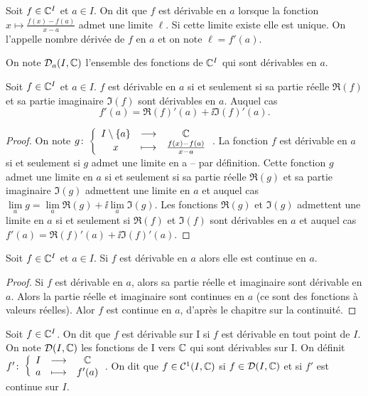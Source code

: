 \begin{defdef}
  Soit \(f \in \mathbb{C}^I\) et \(a \in I\). On dit que \(f\) est dérivable en \(a\) lorsque la fonction \(x \longmapsto \frac{f(x)-f(a)}{x-a}\) admet une limite \(\ell\). Si cette limite existe elle est unique. On l'appelle nombre dérivée de \(f\) en \(a\) et on note \(\ell=f'(a)\).

On note \(\mathcal{D}_{a}(I,\mathbb{C})\) l'ensemble des fonctions de \(\mathbb{C}^I\) qui sont dérivables en \(a\).
\end{defdef}
\begin{theo}
  Soit \(f \in \mathbb{C}^I\) et \(a \in I\). \(f\) est dérivable en \(a\) si et seulement si sa partie réelle \(\Re(f)\) et sa partie imaginaire \(\Im(f)\) sont dérivables en \(a\). Auquel cas
  \begin{equation}
    f'(a) = \Re(f)'(a) + \ii \Im(f)'(a).
  \end{equation}
\end{theo}
\begin{proof}
 On note \(g\colon \left\{\begin{array}{ccc} I\setminus\{a\} & \longrightarrow &\mathbb{C}\\ x & \longmapsto & \frac{f(x)-f(a)}{x-a} \end{array} \right.\). La fonction \(f\) est dérivable en \(a\) si et seulement si \(g\) admet une limite en a -- par définition. Cette fonction \(g\) admet une limite en \(a\) si et seulement si sa partie réelle \(\Re(g)\) et sa partie imaginaire \(\Im(g)\) admettent une limite en \(a\) et auquel cas \(\lim\limits_{a}g =  \lim\limits_{a} \Re(g) + \ii \lim\limits_{a} \Im(g)\). Les fonctions \(\Re(g)\) et \(\Im(g)\) admettent une limite en \(a\) si et seulement si  \(\Re(f)\) et \(\Im(f)\) sont dérivables en \(a\) et auquel cas \(f'(a) = \Re(f)'(a) + \ii \Im(f)'(a)\).
\end{proof}
\begin{prop}
  Soit \(f \in \mathbb{C}^I\) et \(a \in I\). Si \(f\) est dérivable en \(a\) alors elle est continue en \(a\).
\end{prop}
\begin{proof}
  Si \(f\) est dérivable en \(a\), alors sa partie réelle et imaginaire sont dérivable en \(a\). Alors la partie réelle et imaginaire sont continues en \(a\) (ce sont des fonctions à valeurs réelles). Alor \(f\) est continue en \(a\), d'après le chapitre sur la continuité.
\end{proof}
\begin{defdef}
  Soit \(f \in \mathbb{C}^I\). On dit que \(f\) est dérivable sur I si \(f\) est dérivable en tout point de \(I\). On note \(\mathcal{D}(I,\mathbb{C})\) les fonctions de I vers \(\mathbb{C}\) qui sont dérivables sur I. On définit \(f'\colon \left\{\begin{array}{ccc} I & \longrightarrow &\mathbb{C}\\ a & \longmapsto & f'(a) \end{array} \right.\). On dit que \(f \in \mathcal{C}^{1}(I,\mathbb{C})\) si \(f \in \mathcal{D}(I,\mathbb{C})\) et si \(f'\) est continue sur \(I\).
\end{defdef}

